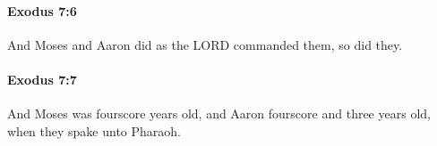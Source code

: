 		\paragraph{Exodus 7:6} %
			\label{EXODUS-7-6}

			And Moses and Aaron did as the LORD commanded them, so did they.


		\paragraph{Exodus 7:7} %
			\label{EXODUS-7-7}

			And Moses was fourscore years old, and Aaron fourscore and three years old, when they spake unto Pharaoh.



